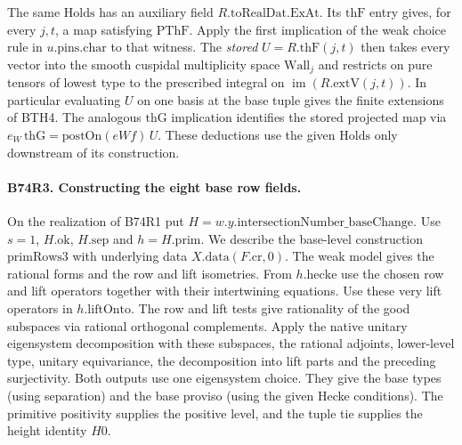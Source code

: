 The same $\mathrm{Holds}$ has an auxiliary field
$R.\mathrm{toRealDat}.\mathrm{ExAt}$. Its $\mathrm{thF}$ entry gives,
for every $j,t$, a map satisfying $\mathrm{PThF}$. Apply the first
implication of the weak choice rule in $u.\mathrm{pins}.\mathrm{char}$
to that witness. The \emph{stored} $U=R.\mathrm{thF}(j,t)$ then
takes every vector into the smooth cuspidal multiplicity space
$\mathrm{Wall}_j$ and restricts on pure tensors of lowest type to
the prescribed integral on $\operatorname{im}(R.\mathrm{extV}(j,t))$.
In particular evaluating $U$ on one basis at the base tuple gives the
finite extensions of BTH4. The analogous $\mathrm{thG}$ implication
identifies the stored projected map via $e_W\,\mathrm{thG}
=\mathrm{postOn}(eWf)\,U$. These deductions use the given
$\mathrm{Holds}$ only downstream of its construction.

\paragraph{B74R3. Constructing the eight base row fields.}
On the realization of B74R1 put $H=w.y.\mathrm{intersectionNumber\_baseChange}$.
Use $s=1$, $H.\mathrm{ok}$, $H.\mathrm{sep}$ and
$h=H.\mathrm{prim}$. We describe the base-level construction
$\mathrm{primRows3}$ with underlying data $X.\mathrm{data}(F.\mathrm{cr},0)$.
The weak model gives the rational forms and the row and lift isometries.
From $h.\mathrm{hecke}$ use the chosen row and lift operators together
with their intertwining equations. Use these very lift operators in
$h.\mathrm{liftOnto}$. The row and lift tests give rationality of the
good subspaces via rational orthogonal complements. Apply the native
unitary eigensystem decomposition with these subspaces, the rational
adjoints, lower-level type, unitary equivariance, the decomposition
into lift parts and the preceding surjectivity. Both outputs use one
eigensystem choice. They give the base types (using separation) and
the base proviso (using the given Hecke conditions).
The primitive positivity supplies the positive level, and the tuple
tie supplies the height identity $H0$.

